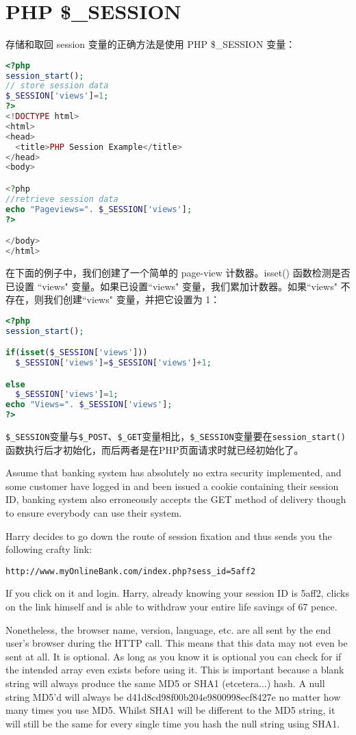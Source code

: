 \section{PHP \$\_SESSION}


存储和取回 session 变量的正确方法是使用 PHP \$\_SESSION 变量：


\begin{lstlisting}[language=PHP]
<?php
session_start();
// store session data
$_SESSION['views']=1;
?>
<!DOCTYPE html>
<html>
<head>
  <title>PHP Session Example</title>
</head>
<body>

<?php
//retrieve session data
echo "Pageviews=". $_SESSION['views'];
?>

</body>
</html>
\end{lstlisting}



在下面的例子中，我们创建了一个简单的 page-view 计数器。isset() 函数检测是否已设置 ``views" 变量。如果已设置``views" 变量，我们累加计数器。如果``views" 不存在，则我们创建``views" 变量，并把它设置为 1：

\begin{lstlisting}[language=PHP]
<?php
session_start();

if(isset($_SESSION['views']))
  $_SESSION['views']=$_SESSION['views']+1;

else
  $_SESSION['views']=1;
echo "Views=". $_SESSION['views'];
?>
\end{lstlisting}

\texttt{\$\_SESSION}变量与\texttt{\$\_POST}、\texttt{\$\_GET}变量相比，\texttt{\$\_SESSION}变量要在\texttt{session\_start()}函数执行后才初始化，而后两者是在PHP页面请求时就已经初始化了。


Assume that banking system has absolutely no extra security implemented, and some customer have logged in and been issued a cookie containing their session ID, banking system also erroneously accepts the GET method of delivery though to ensure everybody can use their system. 

Harry decides to go down the route of session fixation and thus sends you the following crafty link:

\verb|http://www.myOnlineBank.com/index.php?sess_id=5aff2|

If you click on it and login. Harry, already knowing your session ID is 5aff2, clicks on the link himself and is able to withdraw your entire life savings of 67 pence.

Nonetheless, the browser name, version, language, etc. are all sent by the end user's browser during the HTTP call. This means that this data may not even be sent at all. It is optional. As long as you know it is optional you can check for if the intended array even exists before using it. This is important because a blank string will always produce the same MD5 or SHA1 (etcetera...) hash. A null string MD5'd will always be d41d8cd98f00b204e9800998ecf8427e no matter how many times you use MD5. Whilst SHA1 will be different to the MD5 string, it will still be the same for every single time you hash the null string using SHA1.

